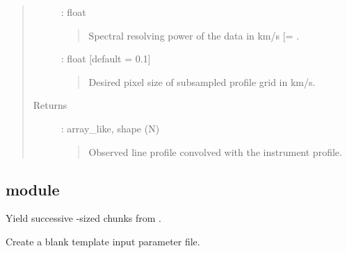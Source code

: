 \documentclass[letterpaper,10pt,english]{sphinxmanual}
\begin{document}
\begin{fulllineitems}
\begin{quote}
\begin{description}
 : float
\begin{quote}

Spectral resolving power of the data in km/s  {[}= \sphinxstyleemphasis{c/R}{]}.
\end{quote}

 : float  {[}default = 0.1{]}
\begin{quote}

Desired pixel size of subsampled profile grid in km/s.
\end{quote}

\item[{Returns}] \leavevmode
{} : array\_like, shape (N)
\begin{quote}

Observed line profile convolved with the instrument profile.
\end{quote}

\end{description}\end{quote}

\end{fulllineitems}



\subsection{module }
\label{\detokenize{api:module-output}}

\begin{fulllineitems}
\label{\detokenize{api:output.chunks}}
Yield successive -sized chunks from .

\end{fulllineitems}


\begin{fulllineitems}
\label{\detokenize{api:output.create_blank_input}}
Create a blank template input parameter file.

\end{fulllineitems}

\end{document}
